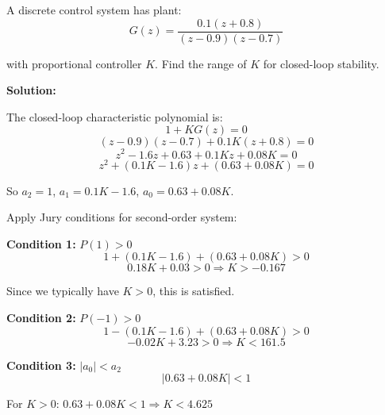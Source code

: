 \begin{example}
\label{ex:jury_closed_loop}

A discrete control system has plant:
\begin{equation}
G(z) = \frac{0.1(z + 0.8)}{(z - 0.9)(z - 0.7)}
\end{equation}

with proportional controller $K$. Find the range of $K$ for closed-loop stability.

\textbf{Solution:}

The closed-loop characteristic polynomial is:
\begin{equation}
1 + KG(z) = 0
\end{equation}
\begin{equation}
(z - 0.9)(z - 0.7) + 0.1K(z + 0.8) = 0
\end{equation}
\begin{equation}
z^2 - 1.6z + 0.63 + 0.1Kz + 0.08K = 0
\end{equation}
\begin{equation}
z^2 + (0.1K - 1.6)z + (0.63 + 0.08K) = 0
\end{equation}

So $a_2 = 1$, $a_1 = 0.1K - 1.6$, $a_0 = 0.63 + 0.08K$.

Apply Jury conditions for second-order system:

\textbf{Condition 1:} $P(1) > 0$
\begin{equation}
1 + (0.1K - 1.6) + (0.63 + 0.08K) > 0
\end{equation}
\begin{equation}
0.18K + 0.03 > 0 \Rightarrow K > -0.167
\end{equation}

Since we typically have $K > 0$, this is satisfied.

\textbf{Condition 2:} $P(-1) > 0$
\begin{equation}
1 - (0.1K - 1.6) + (0.63 + 0.08K) > 0
\end{equation}
\begin{equation}
-0.02K + 3.23 > 0 \Rightarrow K < 161.5
\end{equation}

\textbf{Condition 3:} $|a_0| < a_2$
\begin{equation}
|0.63 + 0.08K| < 1
\end{equation}

For $K > 0$: $0.63 + 0.08K < 1 \Rightarrow K < 4.625$


\end{example}
